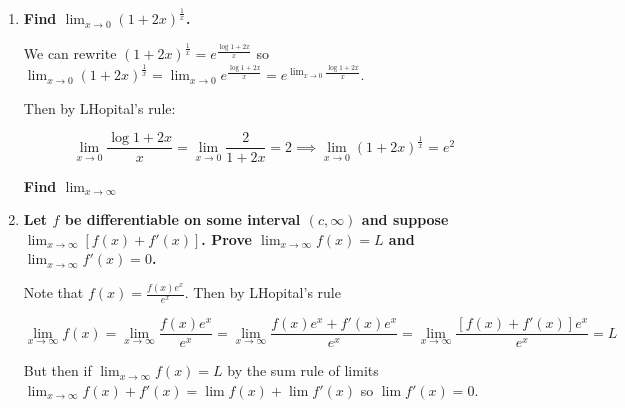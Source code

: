 \documentclass[10pt,a4paper]{article}
\begin{document}
\begin{enumerate}
    \item \textbf{Find $\lim_{x \to 0} (1 + 2x)^{\frac{1}{x}}$.}
        
        We can rewrite $(1 + 2x)^{\frac{1}{x}} =  e^{\frac{\log 1 + 2x}{x}}$ so $\lim_{x \to 0} (1 + 2x)^{\frac{1}{x}} = \lim_{x \to 0} e ^{\frac{\log 1 + 2x}{x}} = e^{\lim_{x \to 0}{\frac{\log 1 + 2x}{x}}} $.

        Then by LHopital's rule:

        $$\lim_{x \to 0}{\frac{\log 1 + 2x}{x}} =  \lim_{x \to 0}{\frac{2}{1+2x}} = 2 \implies \lim_{x \to 0} (1 + 2x)^{\frac{1}{x}} = e^2 $$

        \textbf{ Find $\lim_{x \to \infty}$ }

    \item \textbf{Let $f$ be differentiable on some interval $(c, \infty)$ and suppose $\lim_{x \to \infty} [f(x) + f'(x)]$. Prove $\lim_{x \to \infty} f(x) = L$ and $\lim_{x \to \infty} f'(x) = 0$.}

        Note that $f(x) = \frac{f(x) e^x}{e^x}$. Then by LHopital's rule

        $$\lim_{x \to \infty} f(x) = \lim_{x \to \infty} \frac{f(x) e^x}{e^x} = \lim_{x \to \infty} \frac{f(x) e^x + f'(x)e^x}{e^x} = \lim_{x \to \infty} \frac{[f(x) + f'(x)]e^x}{e^x} = L$$

        But then if $\lim_{x \to \infty} f(x) = L$ by the sum rule of limits $\lim_{x \to \infty} f(x) + f'(x) = \lim f(x) + \lim f'(x)$ so $\lim f'(x) = 0$.


\end{enumerate}
\end{document}
